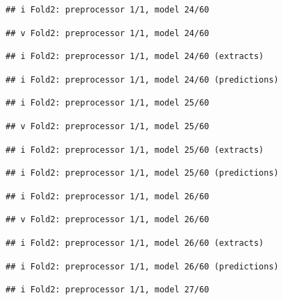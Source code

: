 \documentclass[
]{article}
\begin{document}
\begin{verbatim}
## i Fold2: preprocessor 1/1, model 24/60
\end{verbatim}

\begin{verbatim}
## v Fold2: preprocessor 1/1, model 24/60
\end{verbatim}

\begin{verbatim}
## i Fold2: preprocessor 1/1, model 24/60 (extracts)
\end{verbatim}

\begin{verbatim}
## i Fold2: preprocessor 1/1, model 24/60 (predictions)
\end{verbatim}

\begin{verbatim}
## i Fold2: preprocessor 1/1, model 25/60
\end{verbatim}

\begin{verbatim}
## v Fold2: preprocessor 1/1, model 25/60
\end{verbatim}

\begin{verbatim}
## i Fold2: preprocessor 1/1, model 25/60 (extracts)
\end{verbatim}

\begin{verbatim}
## i Fold2: preprocessor 1/1, model 25/60 (predictions)
\end{verbatim}

\begin{verbatim}
## i Fold2: preprocessor 1/1, model 26/60
\end{verbatim}

\begin{verbatim}
## v Fold2: preprocessor 1/1, model 26/60
\end{verbatim}

\begin{verbatim}
## i Fold2: preprocessor 1/1, model 26/60 (extracts)
\end{verbatim}

\begin{verbatim}
## i Fold2: preprocessor 1/1, model 26/60 (predictions)
\end{verbatim}

\begin{verbatim}
## i Fold2: preprocessor 1/1, model 27/60
\end{verbatim}
\end{document}
